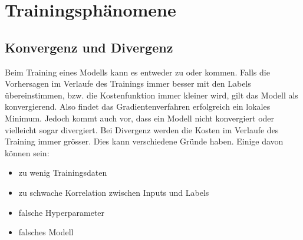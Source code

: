 \cite{Nielsen}

\section{Trainingsphänomene}

\subsection{Konvergenz und Divergenz}
Beim Training eines Modells kann es entweder zu  oder  kommen.
Falls die Vorhersagen im Verlaufe des Trainings immer besser mit den Labels
übereinstimmen, bzw. die Kostenfunktion immer kleiner wird, gilt das Modell als konvergierend.
Also findet das Gradientenverfahren erfolgreich ein lokales Minimum.
\para{}
Jedoch kommt auch vor, dass ein Modell nicht konvergiert oder vielleicht
sogar divergiert. Bei Divergenz werden die Kosten im Verlaufe des Training immer
grösser.
Dies kann verschiedene Gründe haben. Einige davon können sein:
\begin{itemize}
\item{zu wenig Trainingsdaten}
\item{zu schwache Korrelation zwischen Inputs und Labels}
\item{falsche Hyperparameter}
\item{falsches Modell}
\end{itemize}


